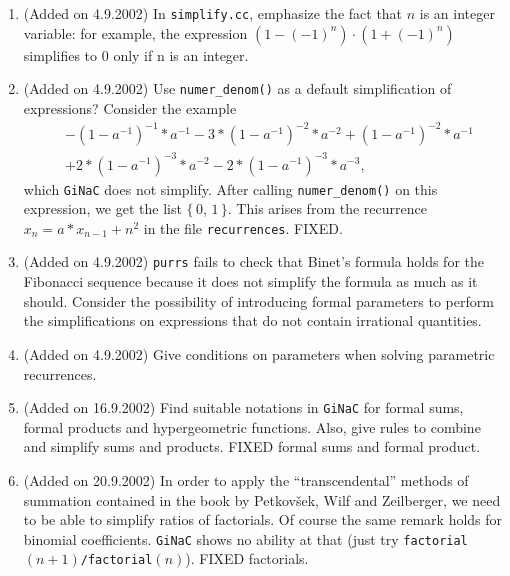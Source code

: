 \documentclass[a4paper]{article}
\begin{document}
\begin{enumerate}

\item (Added on 4.9.2002)
In \texttt{simplify.cc}, emphasize the fact that $n$  is an integer variable:
for example, the expression $(1-(-1)^n) \cdot (1+(-1)^n)$ simplifies to 
0 only if n is an integer.

\item (Added on 4.9.2002)
Use \texttt{numer\_denom()} as a default simplification of expressions?
Consider the example
\[
  \begin{aligned}
  &-(1-a^{-1})^{-1}*a^{-1}
  -
  3*(1-a^{-1})^{-2}*a^{-2}
  +
  (1-a^{-1})^{-2}*a^{-1} \\
  &+
  2*(1-a^{-1})^{-3}*a^{-2}
  -
  2*(1-a^{-1})^{-3}*a^{-3},
  \end{aligned}
\]
which \texttt{GiNaC} does not simplify. After calling 
\texttt{numer\_denom()} on this
expression, we get the list $\{\, 0$, $1\,\}$.
This arises from the recurrence $x_n = a*x_{n-1} + n^2$ in the
file \texttt{recurrences}.
FIXED.

\item (Added on 4.9.2002)
\texttt{purrs} fails to check that Binet's formula holds for the Fibonacci
sequence because it does not simplify the formula as much as it should.
Consider the possibility of introducing formal parameters to perform the
simplifications on expressions that do not contain irrational quantities.

\item (Added on 4.9.2002)
Give conditions on parameters when solving parametric recurrences.

\item (Added on 16.9.2002)
Find suitable notations in \texttt{GiNaC} for formal sums, formal products
and hypergeometric functions.
Also, give rules to combine and simplify sums and products.
FIXED formal sums and formal product.

\item (Added on 20.9.2002)
In order to apply the ``transcendental'' methods of summation contained
in the book by Petkov\v sek, Wilf and Zeilberger, we
need to be able to simplify ratios of factorials.
Of course the same remark holds for binomial coefficients.
\texttt{GiNaC} shows no ability at that (just try
\texttt{factorial$(n+1)$/factorial$(n)$}).
FIXED factorials.


\end{enumerate}
\end{document}
